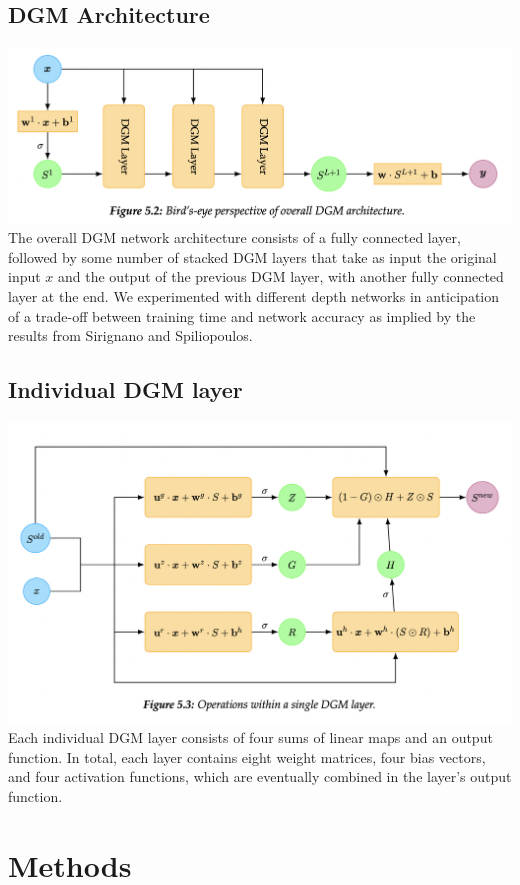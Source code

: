 \documentclass{article}
\begin{document}
\subsection{ DGM Architecture }
\includegraphics[scale=0.32]{Architecture.png}\\
The overall DGM network architecture consists of a fully connected layer, followed by some number of stacked DGM layers that take as input the original input $x$ and the output of the previous DGM layer, with another fully connected layer at the end. We experimented with different depth networks in anticipation of a trade-off between training time and network accuracy as implied by the results from Sirignano and Spiliopoulos.

\subsection{ Individual DGM layer }
\includegraphics[scale=0.32]{DGM_Layer.png}\\
Each individual DGM layer consists of four sums of linear maps and an output function. In total, each layer contains eight weight matrices, four bias vectors, and four activation functions, which are eventually combined in the layer's output function.

\section{Methods}
\end{document}
